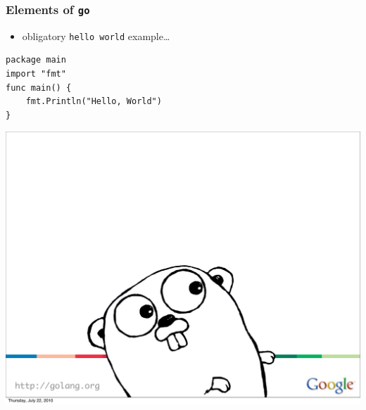 \documentclass[bigger]{beamer}
\begin{document}
\begin{frame}[fragile]
\frametitle{Elements of \verb~go~}
\label{sec-1-8}


\begin{itemize}
\item obligatory \verb~hello world~ example\ldots{}
\end{itemize}


\begin{verbatim}
package main
import "fmt"
func main() {
    fmt.Println("Hello, World")
}
\end{verbatim}




\includegraphics[width=.9\linewidth]{figs/golang-logo.pdf}
\end{frame}
\end{document}
